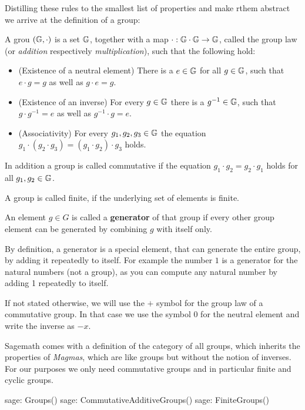 Distilling these rules to the smallest list of properties and make rthem abstract we arrive at the definition of a group:
\begin{definition}[Group]
A grou $ (\mathbb{G}, \cdot) $ is a set $ \mathbb{G}$, together with a map $ \cdot: \mathbb{G} \cdot \mathbb{G} \to \mathbb{G} $, called the group law (or \textit{addition} respectively \textit{multiplication}), such that the following hold:
\begin{itemize}
\item (Existence of a neutral element) There is a $e\in\mathbb{G}$ for all $g\in\mathbb{G}$, such that $e\cdot g=g$ as well as $g\cdot e = g$.
\item (Existence of an inverse) For every $g\in\mathbb{G}$ there is a $g^{-1}\in\mathbb{G}$, such that $g\cdot g^{-1}=e$ as well as $g^{-1}\cdot g = e$.
\item (Associativity) For every $g_1,g_2,g_3\in\mathbb{G}$ the equation 
$g_1\cdot(g_2\cdot g_3) = (g_1\cdot g_2)\cdot g_3$ holds.
\end{itemize}
In addition a group is called commutative if the equation 
$g_1\cdot g_2 = g_2 \cdot g_1$ holds for all $g_1,g_2\in\mathbb{G}$.

A group is called finite, if the underlying set of elements is finite.

An element $g\in G$ is called a \textbf{generator} of that group if every other group element can be generated by combining $g$ with itself only.
\end{definition}
\begin{remark}
By definition, a generator is a special element, that can generate the entire group, by adding it repeatedly to itself. For example the number $1$ is a generator for the natural numbers (not a group), as you can compute any natural number by adding 1 repeatedly to itself.  
\end{remark}
\begin{remark}
If not stated otherwise, we will use the $+$ symbol for the group law of a commutative group. In that case we use the symbol $0$ for the neutral element and write the inverse as $-x$.
\end{remark}
Sagemath comes with a definition of the category of all groups, which inherits the properties of \textit{Magmas}, which are like groups but without the notion of inverses. For our purposes we only need commutative groups and in particular finite and cyclic groups.

\begin{sagecommandline}
sage: Groups()
sage: CommutativeAdditiveGroups()
sage: FiniteGroups()
\end{sagecommandline}

